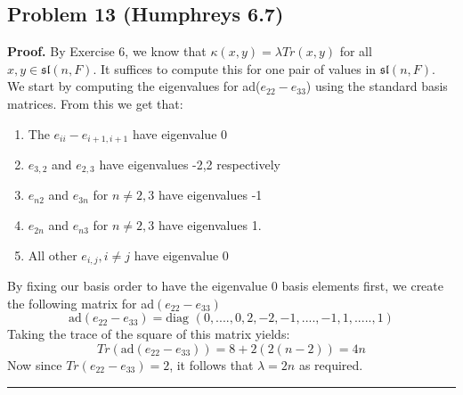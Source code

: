 \documentclass[12pt]{article}%
\newenvironment{proof}[1][Proof]{\textbf{#1.} }{\ \rule{0.5em}{0.5em}}
\begin{document}
\subsection*{Problem 13 (Humphreys 6.7)}
\begin{proof}
By Exercise 6, we know that $\kappa(x,y) = \lambda Tr(x,y)$ for all $x,y \in \mathfrak{sl}(n,F)$. It suffices to compute this for one pair of values in $\mathfrak{sl}(n,F)$. We start by computing the eigenvalues for ad($e_{22} - e_{33}$) using the standard basis matrices. From this we get that:
 \begin{enumerate}
   \item The $e_{ii} - e_{i+1,i+1}$ have eigenvalue 0
   \item $e_{3,2}$ and $e_{2,3}$ have eigenvalues -2,2 respectively
   \item $e_{n2}$ and $e_{3n}$ for $n \neq 2,3$ have eigenvalues -1
   \item $e_{2n}$ and $e_{n3}$ for $n \neq 2,3$ have eigenvalues 1.
   \item All other $e_{i,j}, i \neq j$ have eigenvalue 0
 \end{enumerate}
 By fixing our basis order to have the eigenvalue 0 basis elements first, we create the following matrix for ad$(e_{22} - e_{33})$
 $$ \text{ad}(e_{22} - e_{33}) = \text{diag }(0,....,0,2,-2,-1,....,-1,1,.....,1) $$
 Taking the trace of the square of this matrix yields:
 $$Tr(\text{ad}(e_{22} - e_{33})) = 8 + 2(2(n-2)) = 4n$$
 Now since $Tr(e_{22} - e_{33}) = 2$, it follows that $\lambda = 2n$ as required.
\end{proof}
\end{document}
